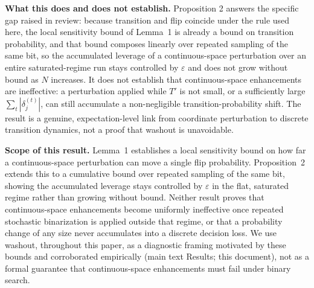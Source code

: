\documentclass[9pt]{article}
\begin{document}
\textbf{What this does and does not establish.} Proposition 2 answers the
specific gap raised in review: because transition and flip coincide under
the rule used here, the local sensitivity bound of Lemma~1 is already a
bound on transition probability, and that bound composes linearly over
repeated sampling of the same bit, so the accumulated leverage of a
continuous-space perturbation over an entire saturated-regime run stays
controlled by $\varepsilon$ and does not grow without bound as $N$
increases. It does not establish that continuous-space enhancements are
ineffective: a perturbation applied while $T'$ is not small, or a
sufficiently large $\sum_t|\delta_j^{(t)}|$, can still accumulate a
non-negligible transition-probability shift. The result is a genuine,
expectation-level link from coordinate perturbation to discrete transition
dynamics, not a proof that washout is unavoidable.

\textbf{Scope of this result.} Lemma~1 establishes a local sensitivity
bound on how far a continuous-space perturbation can move a single flip
probability. Proposition~2 extends this to a cumulative bound over
repeated sampling of the same bit, showing the accumulated leverage stays
controlled by $\varepsilon$ in the flat, saturated regime rather than
growing without bound. Neither result proves that continuous-space
enhancements become uniformly ineffective once repeated stochastic
binarization is applied outside that regime, or that a probability change
of any size never accumulates into a discrete decision loss. We use
washout, throughout this paper, as a diagnostic framing motivated by these
bounds and corroborated empirically (main text Results; this document), not
as a formal guarantee that continuous-space enhancements must fail under
binary search.

\FloatBarrier
\end{document}
